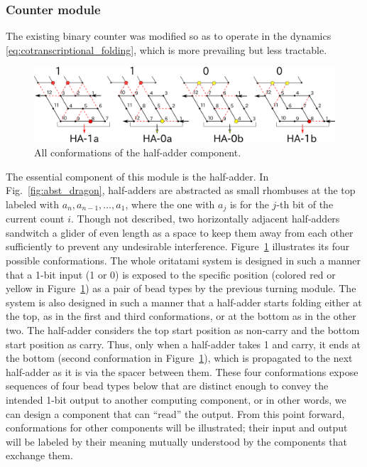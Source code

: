 			\subsubsection{Counter module}
			\label{subsubsec:module_counter}

The existing binary counter \cite{GeMeScSe2016} was modified so as to operate in the dynamics \eqref{eq:cotranscriptional_folding}, which is more prevailing \cite{GeMeScSe2015,HanKim2017,HaKiOtSe2016,OtaSeki2017} but less tractable. 

\begin{figure}[h]
\centering
\includegraphics[width=0.7\linewidth]{pic/counter_zig.png}
 \caption{All conformations of the half-adder component.}
\label{fig:half-adder}
\end{figure}

The essential component of this module is the half-adder. 
In Fig.~\ref{fig:abst_dragon}, half-adders are abstracted as small rhombuses at the top labeled with $a_n, a_{n-1}, \ldots, a_1$, where the one with $a_j$ is for the $j$-th bit of the current count $i$. 
Though not described, two horizontally adjacent half-adders sandwitch a glider of even length as a space to keep them away from each other sufficiently to prevent any undesirable interference. 
Figure~\ref{fig:half-adder} illustrates its four possible conformations. 
The whole oritatami system is designed in such a manner that a 1-bit input (1 or 0) is exposed to the specific position (colored red or yellow in Figure~\ref{fig:half-adder}) as a pair of bead types by the previous turning module. 
The system is also designed in such a manner that a half-adder starts folding either at the top, as in the first and third conformations, or at the bottom as in the other two. 
The half-adder considers the top start position as non-carry and the bottom start position as carry. 
Thus, only when a half-adder takes 1 and carry, it ends at the bottom (second conformation in Figure~\ref{fig:half-adder}), which is propagated to the next half-adder as it is via the spacer between them. 
These four conformations expose sequences of four bead types below that are distinct enough to convey the intended 1-bit output to another computing component, or in other words, we can design a component that can ``read'' the output. 
From this point forward, conformations for other components will be illustrated; their input and output will be labeled by their meaning mutually understood by the components that exchange them. 

